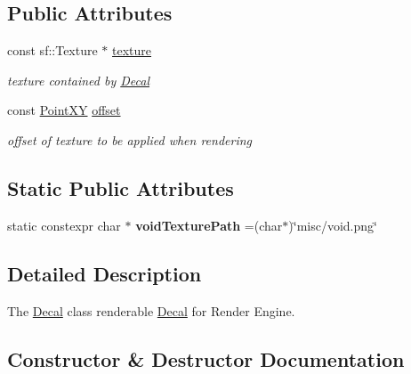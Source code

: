 \subsection*{Public Attributes}
\begin{DoxyCompactItemize}
\item 
\hypertarget{classDecal_a3705e76536e078915d8ebfb6a16434fe}{}const sf\+::\+Texture $\ast$ \hyperlink{classDecal_a3705e76536e078915d8ebfb6a16434fe}{texture}\label{classDecal_a3705e76536e078915d8ebfb6a16434fe}

\begin{DoxyCompactList}\small\item\em texture contained by \hyperlink{classDecal}{Decal} \end{DoxyCompactList}\item 
\hypertarget{classDecal_a9db398b189cffe1f8770f8bce5b8af71}{}const \hyperlink{classPointXY}{Point\+X\+Y} \hyperlink{classDecal_a9db398b189cffe1f8770f8bce5b8af71}{offset}\label{classDecal_a9db398b189cffe1f8770f8bce5b8af71}

\begin{DoxyCompactList}\small\item\em offset of texture to be applied when rendering \end{DoxyCompactList}\end{DoxyCompactItemize}
\subsection*{Static Public Attributes}
\begin{DoxyCompactItemize}
\item 
\hypertarget{classDecal_ae0aef82d67996f23e2ea73795445188e}{}static constexpr char $\ast$ {\bfseries void\+Texture\+Path} =(char$\ast$)\char`\"{}misc/void.\+png\char`\"{}\label{classDecal_ae0aef82d67996f23e2ea73795445188e}

\end{DoxyCompactItemize}


\subsection{Detailed Description}
The \hyperlink{classDecal}{Decal} class renderable \hyperlink{classDecal}{Decal} for Render Engine. 

\subsection{Constructor \& Destructor Documentation}
\hypertarget{classDecal_aea7ec36355a8c52f05bfcdeb2a7afd39}{}
